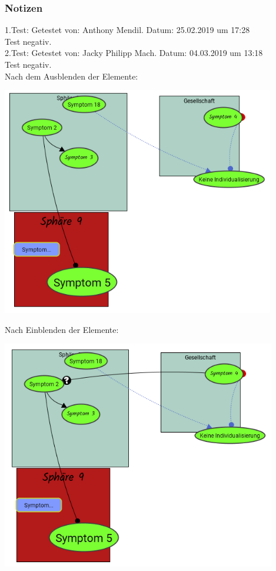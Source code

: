 \documentclass[enabledeprecatedfontcommands]{scrartcl}
\begin{document}
\subsubsection{Notizen}
1.Test: Getestet von: Anthony Mendil. Datum: 25.02.2019 um 17:28 \\
Test negativ. \\
2.Test: Getestet von: Jacky Philipp Mach. Datum: 04.03.2019 um 13:18 \\
Test negativ.\\
Nach dem Ausblenden der Elemente:
\begin{center}
\includegraphics[height=10cm]{3_55.PNG}
\end{center}
Nach Einblenden der Elemente:
\begin{center}
\includegraphics[height=10cm]{3_55eingeblendet.PNG}
\end{center}
\end{document}
